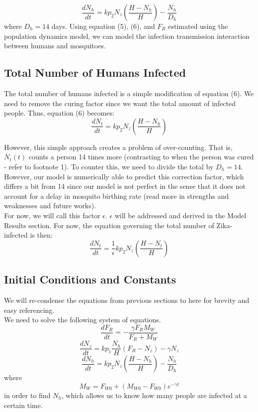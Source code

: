 \documentclass{article}
\begin{document}
\begin{equation}
    \frac{dN_h}{dt} = kp_2N_z (\frac{H-N_h}{H}) - \frac{N_h}{D_h}
\end{equation}
where $D_h=14$ days. Using equation (5), (6), and $F_R$ estimated using the population dynamics model, we can model the infection transmission interaction between humans and mosquitoes.
\subsection{Total Number of Humans Infected}
The total number of humans infected is a simple modification of equation (6). We need to remove the curing factor since we want the total amount of infected people. Thus, equation (6) becomes:
\begin{equation}
    \frac{dN_t}{dt} = kp_2N_z (\frac{H-N_h}{H})
\end{equation}

However, this simple approach creates a problem of over-counting. That is,  $N_t(t)$ counts a person 14 times more (contrasting to when the person was cured - refer to footnote 1). To counter this, we need to divide the total by $D_h=14$. However, our model is numerically able to predict this correction factor, which differs a bit from 14 since our model is not perfect in the sense that it does not account for a delay in mosquito birthing rate (read more in strengths and weaknesses and future works). \\

For now, we will call this factor $\epsilon$. $\epsilon$ will be addressed and derived in the Model Results section. For now, the equation governing the total number of Zika-infected is then:
\begin{equation}
    \frac{dN_t}{dt} = \frac{1}{\epsilon}kp_2N_z (\frac{H-N_t}{H})
\end{equation}

\subsection{Initial Conditions and Constants}
We will re-condense the equations from previous sections to here for brevity and easy referencing.\\

We need to solve the following system of equations.
\begin{equation}
    \frac{dF_R}{dt} = -\frac{\gamma F_R M_W}{F_R + M_W}
\end{equation}
\begin{equation}
    \frac{dN_z}{dt} = kp_1\frac{N_h}{H}(F_R - N_z) - \gamma N_z
\end{equation}
\begin{equation}
    \frac{dN_h}{dt} = kp_2N_z (\frac{H-N_h}{H}) - \frac{N_h}{D_h}
\end{equation}
where
\begin{equation}
    M_W = F_{W0} + (M_{W0} - F_{W0})e^{-\gamma t}
\end{equation}
in order to find $N_h$, which allows us to know how many people are infected at a certain time.\\
\end{document}
